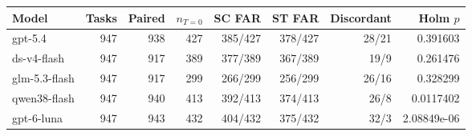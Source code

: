\begin{tabular}{lrrrrrrr}
\hline
Model & Tasks & Paired & $n_{T=0}$ & SC FAR & ST FAR & Discordant & Holm $p$ \\
\hline
gpt-5.4 & 947 & 938 & 427 & 385/427 & 378/427 & 28/21 & 0.391603 \\
ds-v4-flash & 947 & 917 & 389 & 377/389 & 367/389 & 19/9 & 0.261476 \\
glm-5.3-flash & 947 & 917 & 299 & 266/299 & 256/299 & 26/16 & 0.328299 \\
qwen38-flash & 947 & 940 & 413 & 392/413 & 374/413 & 26/8 & 0.0117402 \\
gpt-6-luna & 947 & 943 & 432 & 404/432 & 375/432 & 32/3 & 2.08849e-06 \\
\hline
\end{tabular}
